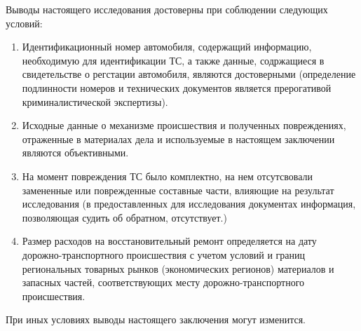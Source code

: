 Выводы настоящего исследования достоверны при соблюдении следующих условий:
\begin{enumerate}
\item Идентификационный номер автомобиля, содержащий информацию, необходимую для идентификации ТС, а также данные, содржащиеся в свидетельстве о регстации автомобиля, являются достоверными (определение подлинности номеров и технических документов является прерогативой криминалистической экспертизы).

\item Исходные данные о механизме происшествия и полученных повреждениях, отраженные в материалах дела и используемые в настоящем заключении являются объективными.

\item  На момент повреждения ТС было комплектно, на нем отсутсвовали замененные или поврежденные составные части, влияющие на результат исследования (в предоставленных для исследования документах информация, позволяющая судить об обратном, отсутствует.)

\item Размер расходов на восстановительный ремонт определяется на дату
дорожно-транспортного происшествия с учетом условий и границ региональных
товарных рынков (экономических регионов) материалов и запасных частей,
соответствующих месту дорожно-транспортного происшествия.

\end{enumerate}
При иных условиях выводы настоящего заключения могут изменится.
